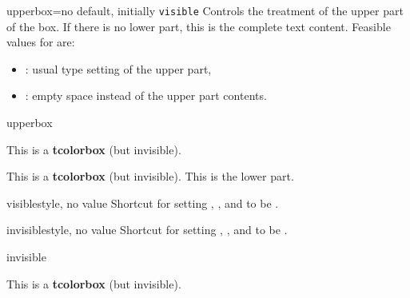 \begin{docTcbKey}[][doc new=2015-01-06]{upperbox}{=}{no default, initially \texttt{visible}}
  Controls the treatment of the upper part of the box. If there is no lower part,
  this is the complete text content.
  Feasible values for  are:
  \begin{itemize}
  \item{}: usual type setting of the upper part,
  \item{}: empty space instead of the upper part contents.
  \end{itemize}
\begin{exdispExample}{upperbox}
\begin{tcolorbox}[upperbox=invisible,colback=white]
This is a \textbf{tcolorbox} (but invisible).
\end{tcolorbox}

\begin{tcolorbox}[upperbox=invisible,colback=white]
This is a \textbf{tcolorbox} (but invisible).
\tcblower
This is the lower part.
\end{tcolorbox}
\end{exdispExample}
\end{docTcbKey}


\begin{docTcbKey}[][doc new and updated={2015-01-06}{2019-03-01}]{visible}{}{style, no value}
  Shortcut for setting , , and 
  to be .
\end{docTcbKey}

\begin{docTcbKey}[][doc new and updated={2015-01-06}{2019-03-01}]{invisible}{}{style, no value}
  Shortcut for setting , , and 
  to be .
\begin{exdispExample}{invisible}
\begin{tcolorbox}[invisible]
This is a \textbf{tcolorbox} (but invisible).
\end{tcolorbox}
\end{exdispExample}
\end{docTcbKey}


